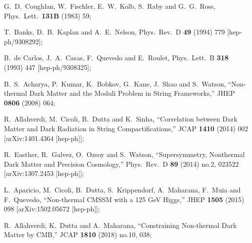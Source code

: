 \documentclass[12pt]{article}
\numberwithin{equation}{section}
\begin{document}
%
\begin{thebibliography}{99}


  G.~D.~Coughlan, W.~Fischler, E.~W.~Kolb, S.~Raby and G.~G.~Ross,
  Phys.\ Lett.\  {\bf 131B} (1983) 59;

  T.~Banks, D.~B.~Kaplan and A.~E.~Nelson,
  Phys.\ Rev.\ D {\bf 49} (1994) 779
  [hep-ph/9308292];
  
  
  B.~de Carlos, J.~A.~Casas, F.~Quevedo and E.~Roulet,
  Phys.\ Lett.\ B {\bf 318} (1993) 447
  [hep-ph/9308325];
 
  

  B.~S.~Acharya, P.~Kumar, K.~Bobkov, G.~Kane, J.~Shao and S.~Watson,
  ``Non-thermal Dark Matter and the Moduli Problem in String Frameworks,''
  JHEP {\bf 0806} (2008) 064;
  
  
R.~Allahverdi, M.~Cicoli, B.~Dutta and K.~Sinha,
  ``Correlation between Dark Matter and Dark Radiation in String Compactifications,''
  JCAP {\bf 1410} (2014) 002
  [arXiv:1401.4364 [hep-ph]];  
  
  R.~Easther, R.~Galvez, O.~Ozsoy and S.~Watson,
  ``Supersymmetry, Nonthermal Dark Matter and Precision Cosmology,''
  Phys.\ Rev.\ D {\bf 89} (2014) no.2,  023522
  [arXiv:1307.2453 [hep-ph]];
  
  
  L.~Aparicio, M.~Cicoli, B.~Dutta, S.~Krippendorf, A.~Maharana, F.~Muia and F.~Quevedo,
  ``Non-thermal CMSSM with a 125 GeV Higgs,''
  JHEP {\bf 1505} (2015) 098
  [arXiv:1502.05672 [hep-ph]];  
  
  
  R.~Allahverdi, K.~Dutta and A.~Maharana,
  ``Constraining Non-thermal Dark Matter by CMB,''
  JCAP {\bf 1810} (2018) no.10,  038;
    

\end{thebibliography}
\end{document}
